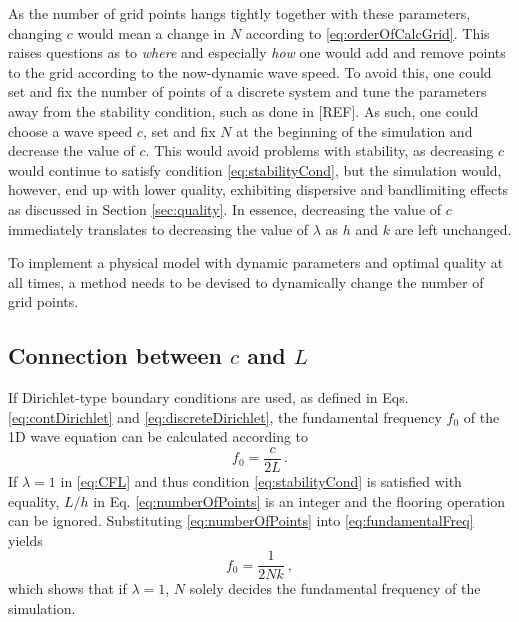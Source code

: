 \documentclass[dvipsnames, preprint]{JASA}
\begin{document}
As the number of grid points hangs tightly together with these parameters, changing $c$ would mean a change in $N$ according to \eqref{eq:orderOfCalcGrid}. This raises questions as to \textit{where} and especially \textit{how} one would add and remove points to the grid according to the now-dynamic wave speed. To avoid this, one could set and fix the number of points of a discrete system and tune the parameters away from the stability condition, such as done in [REF]. As such, one could choose a wave speed $c$, set and fix $N$ at the beginning of the simulation and decrease the value of $c$. This would avoid problems with stability, as decreasing $c$ would continue to satisfy condition \eqref{eq:stabilityCond}, but the simulation would, however, end up with lower quality, exhibiting dispersive and bandlimiting effects as discussed in Section \ref{sec:quality}. In essence, decreasing the value of $c$ immediately translates to decreasing the value of $\lambda$ as $h$ and $k$ are left unchanged.

To implement a physical model with dynamic parameters and optimal quality at all times, a method needs to be devised to dynamically change the number of grid points.



\subsection{Connection between $c$ and $L$}
If Dirichlet-type boundary conditions are used, as defined in Eqs. \eqref{eq:contDirichlet} and \eqref{eq:discreteDirichlet}, the fundamental frequency $f_0$ of the 1D wave equation can be calculated according to
\begin{equation}\label{eq:fundamentalFreq}
    f_0 = \frac{c}{2L}\,.
\end{equation}
If $\lambda = 1$ in \eqref{eq:CFL} and thus condition \eqref{eq:stabilityCond} is satisfied with equality, $L/h$ in Eq. \eqref{eq:numberOfPoints} is an integer and the flooring operation can be ignored. Substituting \eqref{eq:numberOfPoints} into \eqref{eq:fundamentalFreq} yields
\begin{equation}
    f_0 = \frac{1}{2Nk}\ ,
\end{equation}
which shows that if $\lambda = 1$, $N$ solely decides the fundamental frequency of the simulation.
\end{document}
